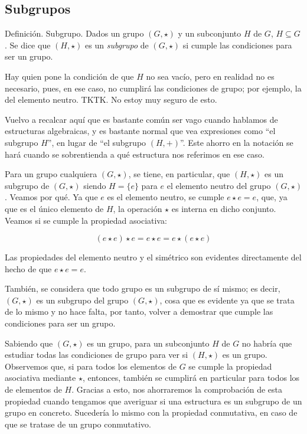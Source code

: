 \subsection{Subgrupos}

Definición. Subgrupo. Dados un grupo $(G, \star)$ y un subconjunto $H$ de
$G$, $H \subseteq G$. Se dice que $(H, \star)$ es un \emph{subgrupo} de $(G,
\star)$ si cumple las condiciones para ser un grupo.

Hay quien pone la condición de que $H$ no sea vacío, pero en realidad no es
necesario, pues, en ese caso, no cumplirá las condiciones de grupo; por
ejemplo, la del elemento neutro. TKTK. No estoy muy seguro de esto.

Vuelvo a recalcar aquí que es bastante común ser vago cuando hablamos de
estructuras algebraicas, y es bastante normal que vea expresiones como ``el
subgrupo $H$'', en lugar de ``el subgrupo $(H, +)$''. Este ahorro en la
notación se hará cuando se sobrentienda a qué estructura nos referimos en
ese caso.

Para un grupo cualquiera $(G, \star)$, se tiene, en particular, que $(H,
\star)$ es un subgrupo de $(G, \star)$ siendo $H = \{e\}$ para $e$ el
elemento neutro del grupo $(G, \star)$. Veamos por qué. Ya que $e$ es el
elemento neutro, se cumple $e \star e = e$, que, ya que es el único elemento
de $H$, la operación $\star$ es interna en dicho conjunto. Veamos si se
cumple la propiedad asociativa:

$$ (e \star e) \star e = e \star e = e \star (e \star e) $$

Las propiedades del elemento neutro y el simétrico son evidentes
directamente del hecho de que $e \star e = e$.

También, se considera que todo grupo es un subgrupo de sí mismo; es decir,
$(G, \star)$ es un subgrupo del grupo $(G, \star)$, cosa que es evidente ya
que se trata de lo mismo y no hace falta, por tanto, volver a demostrar que
cumple las condiciones para ser un grupo.

Sabiendo que $(G, \star)$ es un grupo, para un subconjunto $H$ de $G$ no
habría que estudiar todas las condiciones de grupo para ver si $(H, \star)$
es un grupo. Observemos que, si para todos los elementos de $G$ se cumple la
propiedad asociativa mediante $\star$, entonces, también se cumplirá en
particular para todos los de elementos de $H$. Gracias a esto, nos
ahorraremos la comprobación de esta propiedad cuando tengamos que averiguar
si una estructura es un subgrupo de un grupo en concreto. Sucedería lo mismo
con la propiedad conmutativa, en caso de que se tratase de un grupo
conmutativo.

